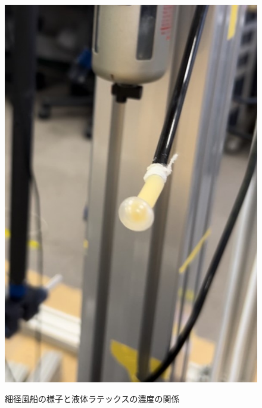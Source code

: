 \begin{figure}[h]
\begin{minipage}{0.33\hsize}
      \includegraphics[scale=0.3]{pic/zu5.jpg}
      \label{fig:40}
  \end{minipage} 
  \caption{細径風船の様子と液体ラテックスの濃度の関係}
  \label{fig:aaa}
\end{figure}

